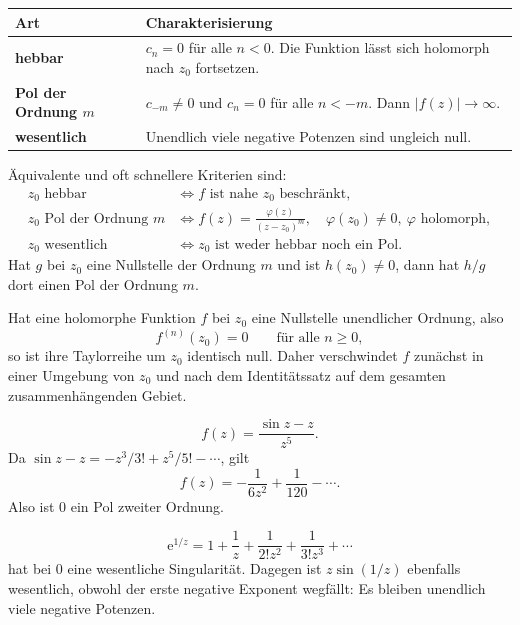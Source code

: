 \documentclass[11pt,a4paper]{article}
\newcommand{\ee}{\mathrm e}
\newcommand{\1}{\mathbf 1}
\begin{document}
{\begin{center}
\begin{tabular}{>{\bfseries}p{3.2cm}p{9.7cm}}
\toprule
Art & Charakterisierung \\
\midrule
hebbar &
$c_n=0$ für alle $n<0$. Die Funktion lässt sich holomorph nach $z_0$ fortsetzen.\\
Pol der Ordnung $m$ &
$c_{-m}\neq0$ und $c_n=0$ für alle $n<-m$. Dann $|f(z)|\to\infty$.\\
wesentlich &
Unendlich viele negative Potenzen sind ungleich null.\\
\bottomrule
\end{tabular}
\end{center}

Äquivalente und oft schnellere Kriterien sind:
\[
\begin{aligned}
z_0\text{ hebbar}
&\Longleftrightarrow f\text{ ist nahe }z_0\text{ beschränkt},\\
z_0\text{ Pol der Ordnung }m
&\Longleftrightarrow
f(z)=\frac{\varphi(z)}{(z-z_0)^m},
\quad \varphi(z_0)\neq0,\ \varphi\text{ holomorph},\\
z_0\text{ wesentlich}
&\Longleftrightarrow z_0\text{ ist weder hebbar noch ein Pol}.
\end{aligned}
\]
Hat $g$ bei $z_0$ eine Nullstelle der Ordnung $m$ und ist $h(z_0)\neq0$, dann hat
$h/g$ dort einen Pol der Ordnung $m$.

\begin{satzbox}[title=Nullstelle unendlicher Ordnung]
Hat eine holomorphe Funktion $f$ bei $z_0$ eine Nullstelle unendlicher Ordnung,
also
\[
f^{(n)}(z_0)=0\qquad\text{für alle }n\geq0,
\]
so ist ihre Taylorreihe um $z_0$ identisch null. Daher verschwindet $f$ zunächst
in einer Umgebung von $z_0$ und nach dem Identitätssatz auf dem gesamten
zusammenhängenden Gebiet.
\end{satzbox}

\begin{beispielbox}[title={Beispiel: Klassifikation ohne vollständige Reihe}]
\[
f(z)=\frac{\sin z-z}{z^5}.
\]
Da $\sin z-z=-z^3/3!+z^5/5!-\cdots$, gilt
\[
f(z)=-\frac1{6z^2}+\frac1{120}-\cdots.
\]
Also ist $0$ ein Pol zweiter Ordnung.
\end{beispielbox}

\begin{beispielbox}[title={Beispiel: wesentliche Singularität}]
\[
\ee^{1/z}=1+\frac1z+\frac1{2!z^2}+\frac1{3!z^3}+\cdots
\]
hat bei $0$ eine wesentliche Singularität. Dagegen ist
$z\sin(1/z)$ ebenfalls wesentlich, obwohl der erste negative Exponent wegfällt:
Es bleiben unendlich viele negative Potenzen.
\end{beispielbox}

}
\end{document}
